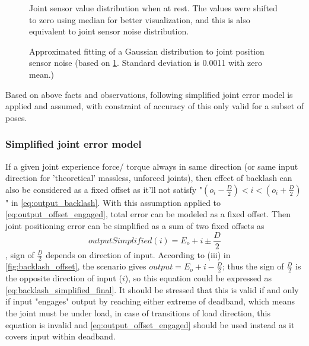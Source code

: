 \documentclass[english, printversion, nomenclature, notitle]{tuvisionthesis} %
\begin{document}
\begin{center}
	\begin{figure}
		\def\svgwidth{\linewidth}
		
		\caption[Joint sensor angle value distribution when at rest.]{Joint sensor value distribution when at rest. The values were shifted to zero using median for better visualization, and this is also equivalent to joint sensor noise distribution.}
		\label{fig:joint_sensor_noise}
	\end{figure}
\end{center}

\begin{center}
	\begin{figure}
		
		\caption{Approximated fitting of a Gaussian distribution to joint position sensor noise (based on \cref{fig:joint_sensor_noise}. Standard deviation is 0.0011 with zero mean.)}
		\label{fig:joint_sensor_noise_gauss}
	\end{figure}
\end{center}

Based on above facts and observations, following simplified joint error model is applied and assumed, with constraint of accuracy of this only valid for a subset of poses.

\subsubsection{Simplified joint error model}
\label{subsubsec:simplified_joint_error_model}
If a given joint experience force/ torque always in same direction (or same input direction for 'theoretical' massless, unforced joints), then effect of backlash can also be considered as a fixed offset as it'll not satisfy "$(o_i - \frac{D}{2}) < i < (o_i + \frac{D}{2})$" in \cref{eq:output_backlash}. With this assumption applied to \cref{eq:output_offset_engaged}, total error can be modeled as a fixed offset. Then joint positioning error can be simplified as a sum of two fixed offsets as \[outputSimplified(i) = E_o + i \pm \frac{D}{2}\], sign of $\frac{D}{2}$ depends on direction of input. According to (iii) in \cref{fig:backlash_offset}, the scenario gives $output = E_o + i - \frac{D}{2}$; thus the sign of $\frac{D}{2}$ is the opposite direction of input ($i$), so this equation could be expressed as \cref{eq:backlash_simplified_final}. It should be stressed that this is valid if and only if input "engages" output by reaching either extreme of deadband, which means the joint must be under load, in case of transitions of load direction, this equation is invalid and \cref{eq:output_offset_engaged} should be used instead as it covers input within deadband.
\end{document}
